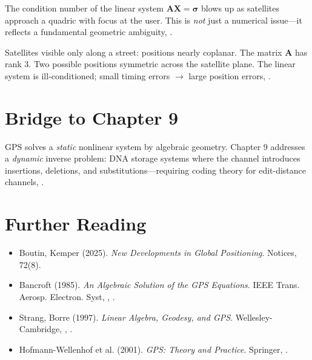 The condition number of the linear system $\bm{A}\bm{X} = \bm{\sigma}$ blows up as satellites approach a quadric with focus at the user. This is \emph{not} just a numerical issue---it reflects a fundamental geometric ambiguity, \cite{boutin2025gps}.

\begin{example}
Satellites visible only along a street: positions nearly coplanar. The matrix $\bm{A}$ has rank 3. Two possible positions symmetric across the satellite plane. The linear system is ill-conditioned; small timing errors $\to$ large position errors, \cite{boutin2025gps}.
\end{example}

\section{Bridge to Chapter 9}
\label{sec:gps:bridge}

GPS solves a \emph{static} nonlinear system by algebraic geometry. Chapter 9 addresses a \emph{dynamic} inverse problem: DNA storage systems where the channel introduces insertions, deletions, and substitutions---requiring coding theory for edit-distance channels, \cite{boutin2025gps}.

\section{Further Reading}
\label{sec:gps:refs}

\begin{itemize}
    \item Boutin, Kemper (2025). \textit{New Developments in Global Positioning}. Notices, 72(8).
    \item Bancroft (1985). \textit{An Algebraic Solution of the GPS Equations}. IEEE Trans. Aerosp. Electron. Syst, \cite{boutin2025gps}, \cite{bancroft1985algebraic}.
    \item Strang, Borre (1997). \textit{Linear Algebra, Geodesy, and GPS}. Wellesley-Cambridge, \cite{boutin2025gps}, \cite{strang1997gps}.
    \item Hofmann-Wellenhof et al. (2001). \textit{GPS: Theory and Practice}. Springer, \cite{boutin2025gps}.
\end{itemize}

